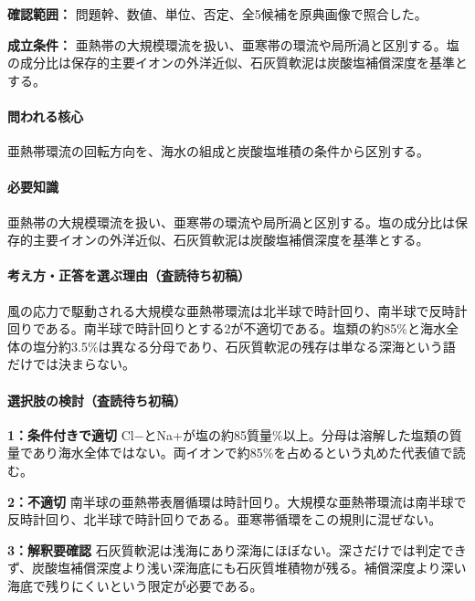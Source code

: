 \noindent\textbf{確認範囲：} 問題幹、数値、単位、否定、全5候補を原典画像で照合した。\par

\noindent\textbf{成立条件：} 亜熱帯の大規模環流を扱い、亜寒帯の環流や局所渦と区別する。塩の成分比は保存的主要イオンの外洋近似、石灰質軟泥は炭酸塩補償深度を基準とする。\par

\paragraph{問われる核心} 亜熱帯環流の回転方向を、海水の組成と炭酸塩堆積の条件から区別する。

\paragraph{必要知識} 亜熱帯の大規模環流を扱い、亜寒帯の環流や局所渦と区別する。塩の成分比は保存的主要イオンの外洋近似、石灰質軟泥は炭酸塩補償深度を基準とする。

\paragraph{考え方・正答を選ぶ理由（査読待ち初稿）} 風の応力で駆動される大規模な亜熱帯環流は北半球で時計回り、南半球で反時計回りである。南半球で時計回りとする2が不適切である。塩類の約85\%と海水全体の塩分約3.5\%は異なる分母であり、石灰質軟泥の残存は単なる深海という語だけでは決まらない。

\paragraph{選択肢の検討（査読待ち初稿）}\mbox{}\par

\noindent\textbf{1：条件付きで適切} Cl−とNa+が塩の約85質量\%以上。分母は溶解した塩類の質量であり海水全体ではない。両イオンで約85\%を占めるという丸めた代表値で読む。\par

\noindent\textbf{2：不適切} 南半球の亜熱帯表層循環は時計回り。大規模な亜熱帯環流は南半球で反時計回り、北半球で時計回りである。亜寒帯循環をこの規則に混ぜない。\par

\noindent\textbf{3：解釈要確認} 石灰質軟泥は浅海にあり深海にほぼない。深さだけでは判定できず、炭酸塩補償深度より浅い深海底にも石灰質堆積物が残る。補償深度より深い海底で残りにくいという限定が必要である。\par


